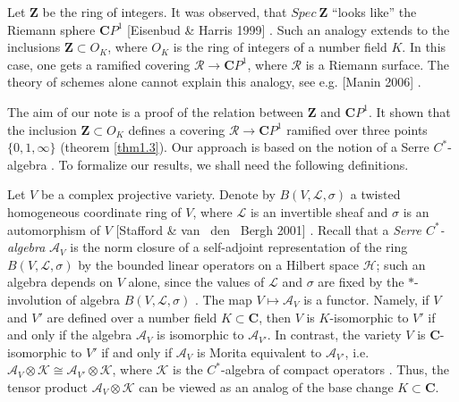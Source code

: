\documentclass[10pt, reqno]{amsart}
\theoremstyle{definition}
\theoremstyle{remark}
\numberwithin{equation}{section}
\begin{document}
Let  $\mathbf{Z}$ be  the ring of integers.  It was observed,  that $Spec~\mathbf{Z}$
 ``looks  like''   the Riemann sphere $\mathbf{C}P^1$  [Eisenbud \& Harris 1999] \cite[p. 83]{EH}.
Such an analogy extends to the inclusions $\mathbf{Z}\subset O_K$, where  $O_K$ is the ring of integers 
of a number field $K$.  In this case,  one gets  a  ramified covering $\mathscr{R}\to\mathbf{C}P^1$,  where  
$\mathscr{R}$ is a Riemann surface.  The  theory of schemes alone  cannot explain  this analogy,
see e.g.  [Manin 2006] \cite[Section 2.2]{Man1}. 

\medskip
The aim of our note  is a proof of the relation  between  $\mathbf{Z}$ and $\mathbf{C}P^1$.
It shown  that  the inclusion  $\mathbf{Z}\subset O_K$ defines  
a  covering $\mathscr{R}\to\mathbf{C}P^1$ ramified over three points $\{0,1,\infty\}$ (theorem \ref{thm1.3}).
Our approach  is based on the notion of a Serre $C^*$-algebra \cite[Section 5.3.1] {N}.   
 To formalize our results, we shall need the following definitions. 

\medskip
Let $V$ be a complex projective variety. Denote by $B(V, \mathcal{L}, \sigma)$ a twisted 
homogeneous coordinate ring of $V$, where $\mathcal{L}$ is an invertible sheaf and $\sigma$
is an automorphism of $V$ [Stafford \& van ~den ~Bergh 2001]  \cite[p. 173]{StaVdb1}. 
Recall that a {\it Serre $C^*$-algebra} $\mathscr{A}_V$  is the norm closure of a
self-adjoint representation of the ring  $B(V, \mathcal{L}, \sigma)$ by the bounded linear 
operators  on a Hilbert space $\mathscr{H}$;  such an algebra depends on $V$ alone,
since the values of $\mathcal{L}$ and $\sigma$ are fixed by the $\ast$-involution of algebra
$B(V, \mathcal{L}, \sigma)$  \cite[Section 5.3.1] {N}. 
The map $V\mapsto \mathscr{A}_V$ is a functor. 
 Namely, if $V$ and $V'$ are  defined over a number field $K\subset\mathbf{C}$,
then $V$ is $K$-isomorphic to $V'$ if and only if the algebra $\mathscr{A}_V$ is isomorphic to  $\mathscr{A}_{V'}$. 
In  contrast, the variety $V$ is $\mathbf{C}$-isomorphic to $V'$ if and only if  $\mathscr{A}_V$ is Morita equivalent to  
$\mathscr{A}_{V'}$, i.e.  $\mathscr{A}_V\otimes\mathscr{K}\cong \mathscr{A}_{V'}\otimes\mathscr{K}$,
where  $\mathscr{K}$  is the $C^*$-algebra of  compact operators \cite[Corollary 1.2]{Nik1}.
Thus, the tensor  product  $\mathscr{A}_V\otimes\mathscr{K}$ can be viewed as  an analog of the base change $K\subset\mathbf{C}$. 
\end{document}
